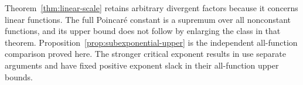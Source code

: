 \begin{remark}
Theorem~\ref{thm:linear-scale} retains arbitrary divergent factors
because it concerns linear functions. The full Poincar\'e constant is
a supremum over all nonconstant functions, and its upper bound does not
follow by enlarging the class in that theorem. Proposition~\ref{prop:subexponential-upper}
is the independent all-function comparison proved here. The stronger
critical exponent results in \cite[Theorem~1.1]{criticalmixingcompanion}
use separate arguments and have fixed positive exponent slack in their
all-function upper bounds.
\end{remark}

